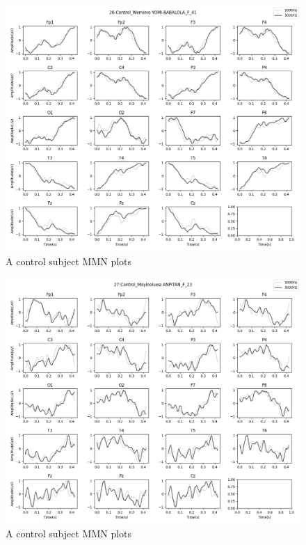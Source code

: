 \documentclass[10pt]{article}
\begin{document}
\begin{figure}[H]
  \includegraphics[width=16cm]{../../../data_analysis_results/MMN/time_series/Control/26.png}
  \caption{A control subject MMN plots}
\end{figure}
\begin{figure}[H]
  \includegraphics[width=16cm]{../../../data_analysis_results/MMN/time_series/Control/27.png}
  \caption{A control subject MMN plots}
\end{figure}
\end{document}
